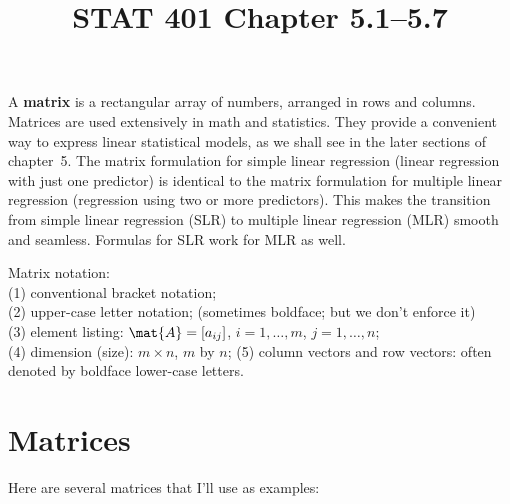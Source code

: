 \documentclass[12pt]{article}
\begin{document}
\title{STAT 401 Chapter 5.1--5.7}
\maketitle


A {\bf matrix} is a rectangular array of numbers, arranged in rows and columns.
Matrices are used extensively in math and statistics.  They provide a convenient
way to express linear statistical models, as we shall see in the later sections
of chapter~5.
The matrix formulation for simple linear regression (linear regression with
just one predictor) is identical to the matrix formulation for
multiple linear regression (regression using two or more predictors).
This makes the transition from simple linear regression (SLR) to
multiple linear regression (MLR) smooth and seamless.  Formulas for SLR
work for MLR as well.


Matrix notation:\\
(1) conventional bracket notation;\\
(2) upper-case letter notation; (sometimes boldface; but we don't
enforce it)\\
(3) element listing: $\mat{A} = [a_{ij}]$,
$i = 1,\dotsc,m$, $j = 1,\dotsc, n$;\\
(4) dimension (size): $m \times n$, $m$ by $n$;
(5) column vectors and row vectors: often denoted by
boldface lower-case letters.

\section{Matrices}

Here are several matrices that I'll use as examples:
\end{document}
